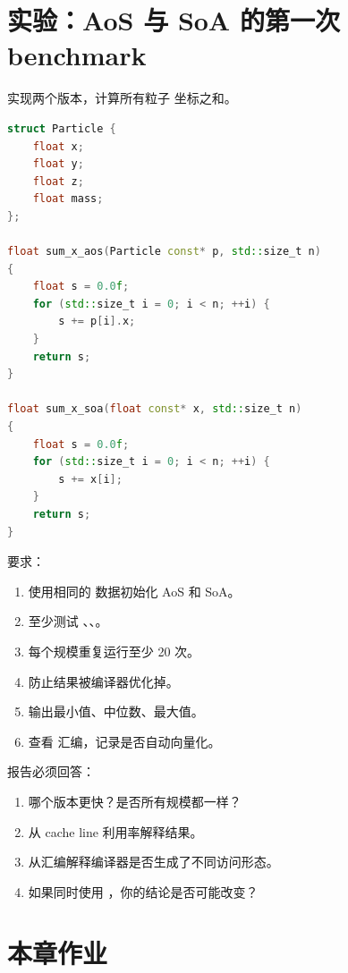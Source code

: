 \section{实验：AoS 与 SoA 的第一次 benchmark}

\begin{labbox}
实现两个版本，计算所有粒子  坐标之和。

\begin{lstlisting}[language=C++]
struct Particle {
    float x;
    float y;
    float z;
    float mass;
};

float sum_x_aos(Particle const* p, std::size_t n)
{
    float s = 0.0f;
    for (std::size_t i = 0; i < n; ++i) {
        s += p[i].x;
    }
    return s;
}

float sum_x_soa(float const* x, std::size_t n)
{
    float s = 0.0f;
    for (std::size_t i = 0; i < n; ++i) {
        s += x[i];
    }
    return s;
}
\end{lstlisting}

要求：

\begin{enumerate}
  \item 使用相同的  数据初始化 AoS 和 SoA。
  \item 至少测试 、、。
  \item 每个规模重复运行至少 20 次。
  \item 防止结果被编译器优化掉。
  \item 输出最小值、中位数、最大值。
  \item 查看  汇编，记录是否自动向量化。
\end{enumerate}

报告必须回答：

\begin{enumerate}
  \item 哪个版本更快？是否所有规模都一样？
  \item 从 cache line 利用率解释结果。
  \item 从汇编解释编译器是否生成了不同访问形态。
  \item 如果同时使用 ，你的结论是否可能改变？
\end{enumerate}
\end{labbox}

\section{本章作业}

